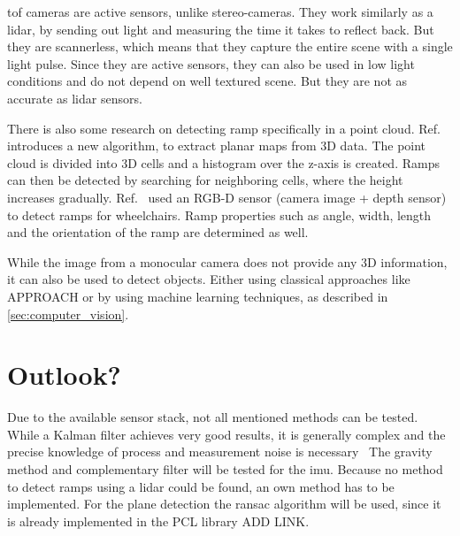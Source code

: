 \gls{tof} cameras are active sensors, unlike stereo-cameras.
They work similarly as a \gls{lidar}, by sending out light and measuring the time it takes to reflect back.
But they are scannerless, which means that they capture the entire scene with a single light pulse.
Since they are active sensors, they can also be used in low light conditions and do not depend on well textured scene.
But they are not as accurate as \gls{lidar} sensors.

There is also some research on detecting ramp specifically in a point cloud.
Ref.~\cite{Sakenas2007} introduces a new algorithm, to extract planar maps from 3D data.
The point cloud is divided into 3D cells and a histogram over the z-axis is created.
Ramps can then be detected by searching for neighboring cells, where the height increases gradually.
Ref.~\cite{Nejati2016} used an RGB-D sensor (camera image + depth sensor) to detect ramps for wheelchairs.
Ramp properties such as angle, width, length and the orientation of the ramp are determined as well.

While the image from a monocular camera does not provide any 3D information, it can also be used to detect objects.
Either using classical approaches like APPROACH or by using machine learning techniques, as described in \cref{sec:computer_vision}.




\section{Outlook?}
Due to the available sensor stack, not all mentioned methods can be tested.
While a Kalman filter achieves very good results, it is generally complex and the precise knowledge of process and measurement noise is necessary~\cite{Higgins1975}
The gravity method and complementary filter will be tested for the \gls{imu}.
Because no method to detect ramps using a \gls{lidar} could be found, an own method has to be implemented.
For the plane detection the \gls{ransac} algorithm will be used, since it is already implemented in the PCL library ADD LINK.